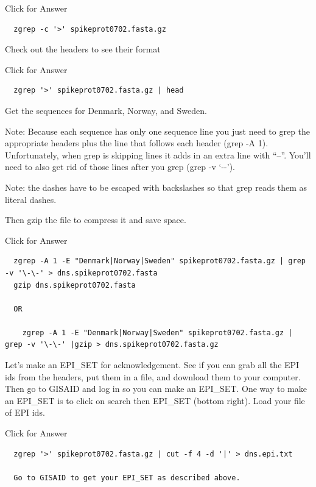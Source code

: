 \documentclass[
]{book}
\begin{document}
Click for Answer

\begin{verbatim}
  zgrep -c '>' spikeprot0702.fasta.gz
\end{verbatim}

\hfill\break

Check out the headers to see their format

Click for Answer

\begin{verbatim}
  zgrep '>' spikeprot0702.fasta.gz | head
\end{verbatim}

\hfill\break

Get the sequences for Denmark, Norway, and Sweden.

Note: Because each sequence has only one sequence line you just need to grep the appropriate headers plus the line that follows each header (grep -A 1). Unfortunately, when grep is skipping lines it adds in an extra line with ``--''. You'll need to also get rid of those lines after you grep (grep -v `-\/-').

Note: the dashes have to be escaped with backslashes so that grep reads them as literal dashes.

Then gzip the file to compress it and save space.

Click for Answer

\begin{verbatim}
  zgrep -A 1 -E "Denmark|Norway|Sweden" spikeprot0702.fasta.gz | grep -v '\-\-' > dns.spikeprot0702.fasta
  gzip dns.spikeprot0702.fasta
  
  OR
  
    zgrep -A 1 -E "Denmark|Norway|Sweden" spikeprot0702.fasta.gz | grep -v '\-\-' |gzip > dns.spikeprot0702.fasta.gz
\end{verbatim}

\hfill\break

Let's make an EPI\_SET for acknowledgement. See if you can grab all the EPI ids from the headers, put them in a file, and download them to your computer. Then go to GISAID and log in so you can make an EPI\_SET. One way to make an EPI\_SET is to click on search then EPI\_SET (bottom right). Load your file of EPI ids.

Click for Answer

\begin{verbatim}
  zgrep '>' spikeprot0702.fasta.gz | cut -f 4 -d '|' > dns.epi.txt
  
  Go to GISAID to get your EPI_SET as described above.
\end{verbatim}
\end{document}
